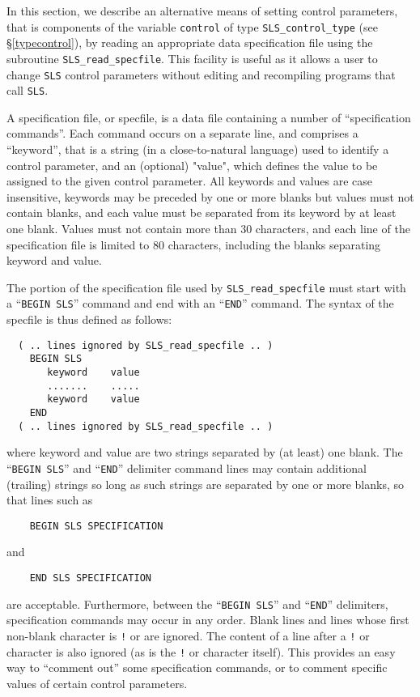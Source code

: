 \documentclass{galahad}
\newcommand{\packagename}{SLS}
\begin{document}

\galcontrolfeatures
\noindent In this section, we describe an alternative means of setting
control parameters, that is components of the variable {\tt control} of type
{\tt \packagename\_control\_type}
(see \S\ref{typecontrol}),
by reading an appropriate data specification file using the
subroutine {\tt \packagename\_read\_specfile}. This facility
is useful as it allows a user to change  {\tt \packagename} control parameters
without editing and recompiling programs that call {\tt \packagename}.

A specification file, or specfile, is a data file containing a number of
``specification commands''. Each command occurs on a separate line,
and comprises a ``keyword'',
that is a string (in a close-to-natural language) used to identify a
control parameter, and
an (optional) "value", which defines the value to be assigned to the given
control parameter. All keywords and values are case insensitive,
keywords may be preceded by one or more blanks but
values must not contain blanks, and
each value must be separated from its keyword by at least one blank.
Values must not contain more than 30 characters, and
each line of the specification file is limited to 80 characters,
including the blanks separating keyword and value.

The portion of the specification file used by
{\tt \packagename\_read\_specfile}
must start
with a ``{\tt BEGIN \packagename}'' command and end with an
``{\tt END}'' command.  The syntax of the specfile is thus defined as follows:
\begin{verbatim}
  ( .. lines ignored by SLS_read_specfile .. )
    BEGIN SLS
       keyword    value
       .......    .....
       keyword    value
    END
  ( .. lines ignored by SLS_read_specfile .. )
\end{verbatim}
where keyword and value are two strings separated by (at least) one blank.
The ``{\tt BEGIN \packagename}'' and ``{\tt END}'' delimiter command lines
may contain additional (trailing) strings so long as such strings are
separated by one or more blanks, so that lines such as
\begin{verbatim}
    BEGIN SLS SPECIFICATION
\end{verbatim}
and
\begin{verbatim}
    END SLS SPECIFICATION
\end{verbatim}
are acceptable. Furthermore,
between the
``{\tt BEGIN \packagename}'' and ``{\tt END}'' delimiters,
specification commands may occur in any order.  Blank lines and
lines whose first non-blank character is {\tt !} or {\tt *} are ignored.
The content
of a line after a {\tt !} or {\tt *} character is also
ignored (as is the {\tt !} or {\tt *}
character itself). This provides an easy way to ``comment out'' some
specification commands, or to comment specific values
of certain control parameters.
\end{document}
